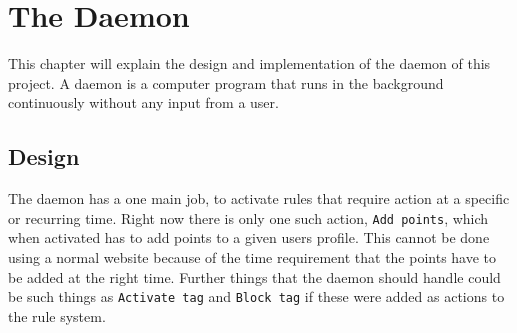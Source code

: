\chapter{The Daemon}
This chapter will explain the design and implementation of the daemon of this project. A daemon is a computer program that runs in the background continuously without any input from a user.
\section{Design}
The daemon has a one main job, to activate rules that require action at a specific or recurring time. Right now there is only one such action, \texttt{Add points}, which when activated has to add points to a given users profile. This cannot be done using a normal website because of the time requirement that the points have to be added at the right time. Further things that the daemon should handle could be such things as \texttt{Activate tag} and \texttt{Block tag} if these were added as actions to the rule system.

